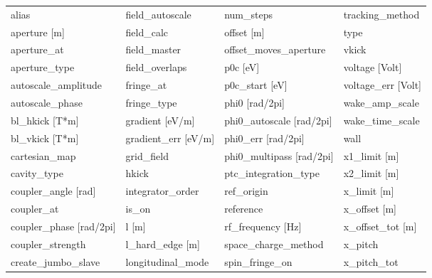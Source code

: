  \begin{tabular}{llll} \toprule
alias                          & field_autoscale                & num_steps                      & tracking_method                \\
aperture [m]                   & field_calc                     & offset [m]                     & type                           \\
aperture_at                    & field_master                   & offset_moves_aperture          & vkick                          \\
aperture_type                  & field_overlaps                 & p0c [eV]                       & voltage [Volt]                 \\
autoscale_amplitude            & fringe_at                      & p0c_start [eV]                 & voltage_err [Volt]             \\
autoscale_phase                & fringe_type                    & phi0 [rad/2pi]                 & wake_amp_scale                 \\
bl_hkick [T*m]                 & gradient [eV/m]                & phi0_autoscale [rad/2pi]       & wake_time_scale                \\
bl_vkick [T*m]                 & gradient_err [eV/m]            & phi0_err [rad/2pi]             & wall                           \\
cartesian_map                  & grid_field                     & phi0_multipass [rad/2pi]       & x1_limit [m]                   \\
cavity_type                    & hkick                          & ptc_integration_type           & x2_limit [m]                   \\
coupler_angle [rad]            & integrator_order               & ref_origin                     & x_limit [m]                    \\
coupler_at                     & is_on                          & reference                      & x_offset [m]                   \\
coupler_phase [rad/2pi]        & l [m]                          & rf_frequency [Hz]              & x_offset_tot [m]               \\
coupler_strength               & l_hard_edge [m]                & space_charge_method            & x_pitch                        \\
create_jumbo_slave             & longitudinal_mode              & spin_fringe_on                 & x_pitch_tot                    \\

\end{tabular}

